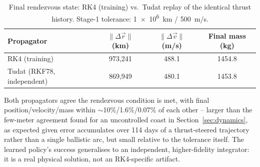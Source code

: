 \begin{table}[H]
  \centering
  \caption{Final rendezvous state: RK4 (training) vs.\ Tudat replay of the identical thrust
    history. Stage-1 tolerance: \SI{1e6}{km} / \SI{500}{m/s}.}
  \label{tab:tudat-verify}
  \begin{tabular}{lccc}
    \toprule
    Propagator & $\lVert\Delta\vec r\rVert$ (km) & $\lVert\Delta\vec v\rVert$ (m/s) & Final mass (kg) \\
    \midrule
    RK4 (training) & 973{,}241 & 488.1 & 1454.8 \\
    Tudat (RKF78, independent) & 869{,}949 & 480.1 & 1453.8 \\
    \bottomrule
  \end{tabular}
\end{table}

Both propagators agree the rendezvous condition is met, with final position/velocity/mass within
$\sim$10\%/1.6\%/0.07\% of each other -- larger than the few-meter agreement found for an
uncontrolled coast in Section~\ref{sec:dynamics}, as expected given error accumulates over 114
days of a thrust-steered trajectory rather than a single ballistic arc, but small relative to the
tolerance itself. The learned policy's success generalises to an independent, higher-fidelity
integrator: it is a real physical solution, not an RK4-specific artifact.
